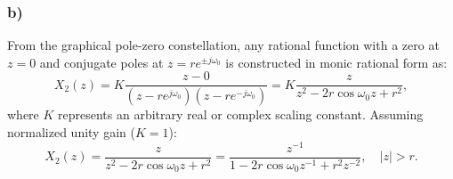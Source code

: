 \documentclass[12pt,a4paper]{article}
\begin{document}
\subsubsection*{b)}
From the graphical pole-zero constellation, any rational function with a zero at $z=0$ and conjugate poles at $z = r e^{\pm j\omega_0}$ is constructed in monic rational form as:
\begin{equation}
    X_2(z) = K \frac{z - 0}{(z - r e^{j\omega_0})(z - r e^{-j\omega_0})} = K \frac{z}{z^2 - 2r \cos\omega_0 z + r^2},
\end{equation}
where $K$ represents an arbitrary real or complex scaling constant. Assuming normalized unity gain ($K = 1$):
\begin{equation}
    X_2(z) = \frac{z}{z^2 - 2r \cos\omega_0 z + r^2} = \frac{z^{-1}}{1 - 2r \cos\omega_0 z^{-1} + r^2 z^{-2}}, \quad |z| > r.
\end{equation}
\end{document}
